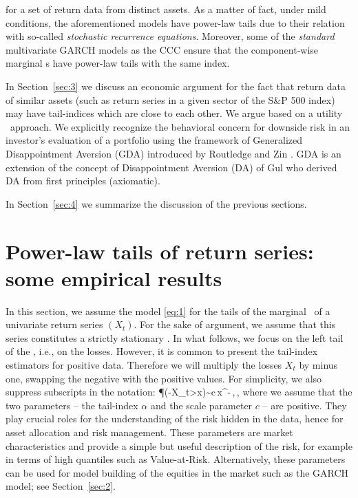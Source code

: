 for a set of return data from distinct assets. As a matter of fact, under mild conditions, the aforementioned models
have power-law tails due to their relation with so-called {\em stochastic recurrence equations}. Moreover, some of the {\em standard} multivariate 
GARCH models as the CCC ensure that the component-wise marginal \ds s have power-law tails with the same index.
\par
In Section~\ref{sec:3} we discuss an economic argument for the fact that return data of similar assets
(such as return series in a given sector of the S\&P 500 index) may have tail-indices which are close to each other.
We argue based on a  utility \fct\ approach. We explicitly recognize the behavioral
concern for downside risk in an investor's evaluation of a portfolio
using the framework of Generalized Disappointment Aversion (GDA)
introduced by Routledge and Zin \cite{routledge2010generalized}. GDA
is an extension of the concept of Disappointment Aversion (DA) of Gul \cite{gul:1991} who derived DA from first principles (axiomatic).

In Section~\ref{sec:4} we summarize the discussion of the previous
sections. 

\section{Power-law tails of return series: some empirical results}\label{sec:1}\setcounter{equation}{0}
In this section, we assume the model \eqref{eq:1} for the tails of the marginal
\ds\ of a univariate return series $(X_t)$. For the sake of argument, we assume
that this series constitutes a strictly stationary \seq . In what follows, we focus
on the left tail of the \ds , i.e., on the losses. 
However, it is common to present the tail-index estimators
for positive data. Therefore we will multiply the losses $X_t$ by
minus one, swapping the negative with the positive values.
For simplicity, we also suppress subscripts in the notation:
\beam\label{eq:1a}
\P(-X_t>x)\sim c\,x^{-\alpha}\,,\qquad \xto\,,
\eeam
where we assume that the two parameters -- the tail-index  $\alpha$ and the scale parameter
$c$ -- are positive. They play crucial roles for the understanding of the risk hidden in the data, hence 
for asset allocation and risk management. These parameters are market characteristics  and provide a simple but 
useful description of the risk, for example in terms of high quantiles such as
Value-at-Risk. Alternatively, these parameters can be
used for model building of the equities in the market such as the GARCH model; see Section~\ref{sec:2}.

